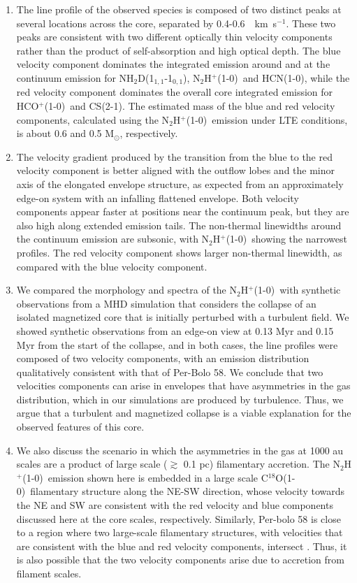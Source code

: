 \documentclass[iop]{emulateapj}
\newcommand{\kms}{\,~km~s$^{-1}$}
\newcommand{\nhtd}{\mbox{\rm NH$_2$D(1$_{1,1}$-1$_{0,1}$)}}
\newcommand{\nthp}{\mbox{\rm N$_2$H$^+$(1-0)}}
\newcommand{\hcn}{\mbox{\rm HCN(1-0)}}
\newcommand{\hcop}{\mbox{\rm  HCO$^+$(1-0)}}
\newcommand{\cs}{\mbox{\rm CS(2-1)}}
\newcommand{\ceo}{\mbox{\rm C$^{18}$O(1-0)}}
\begin{document}
\begin{enumerate}

\item
The line profile of the observed species is composed of two distinct peaks at several locations across the core, separated by 0.4-0.6 \kms. These two peaks are consistent with two different optically thin velocity components rather than the product of self-absorption and high optical depth. The blue velocity component dominates the integrated emission around and at the continuum emission for \nhtd, \nthp\ and \hcn, while the red velocity component dominates the overall core integrated emission for \hcop\ and \cs. The estimated mass of the blue and red velocity components, calculated using the \nthp\ emission under LTE conditions, is about 0.6 and 0.5  M$_{\odot}$, respectively. %

\item
The velocity gradient produced by the transition from the blue to the red velocity component is better aligned with the outflow lobes and the minor axis of the elongated envelope structure, as expected from an approximately edge-on system with an infalling flattened envelope. Both velocity components appear faster at positions near the continuum peak, but they are also high along extended emission tails. The non-thermal linewidths around the continuum emission are subsonic, with \nthp\ showing the narrowest profiles. The red velocity component shows larger non-thermal linewidth, as compared with the blue velocity component.


\item
We compared the morphology and spectra of the \nthp\ with synthetic observations from a MHD simulation that considers the collapse of an isolated magnetized core that is initially perturbed with a turbulent field. We showed synthetic observations from an edge-on view at 0.13 Myr and 0.15 Myr from the start of the collapse, and in both cases, the line profiles were composed of two velocity components, with an emission distribution qualitatively consistent with that of Per-Bolo 58. We conclude that two velocities components can arise in envelopes that have asymmetries in the gas distribution, which in our simulations are produced by turbulence. Thus, we argue that a turbulent and magnetized collapse is a viable explanation for the observed features of this core.

\item
We also discuss the scenario in which the asymmetries in the gas at 1000 au scales are a product of large scale ($\gtrsim$ 0.1 pc) filamentary accretion. The \nthp\ emission shown here is embedded in a large scale \ceo\ filamentary structure along the NE-SW direction, whose velocity towards the NE and SW are consistent with the red velocity and blue components discussed here at the core scales, respectively. Similarly, Per-bolo 58 is close to a region where two large-scale filamentary structures, with velocities that are consistent with the blue and red velocity components, intersect \citep{2017HacarFibers}. Thus, it is also possible that the two velocity components arise due to accretion from filament scales.


\end{enumerate}
\end{document}
